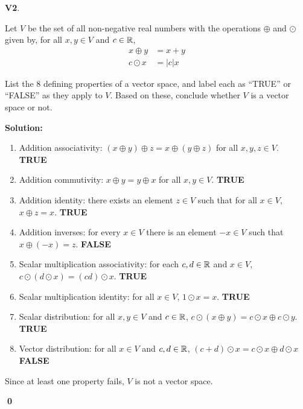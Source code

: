 \documentclass{article}
\newenvironment{problem}[1]
{
	\begin{flushleft}
	\textbf{#1}.
	\ignorespaces
}
{
	\end{flushleft}
}
\newenvironment{solution}
{
	\ignorespaces
	\textbf{Solution:}
}
{
	\ignorespacesafterend
	\begin{flushright}
	{\bfseries \qed}
	\end{flushright}
}
\begin{document}
\begin{problem}{V2}
	Let \(V\) be the set of all non-negative real numbers with the operations
	\(\oplus\) and \(\odot\) given by, for all \(x,y \in V\) and \(c \in \mathbb{R}\),
	\begin{align*}
	x \oplus y &= x+y \\
	c \odot x &= |c|x
	\end{align*}

	List the 8 defining properties of a vector space, and label each as
	``TRUE'' or ``FALSE'' as they apply to \(V\). Based on these, conclude whether
	\(V\) is a vector space or not.
	\end{problem}
\begin{solution}
	\begin{enumerate}[1)]
		\item Addition associativity:
					\((x\oplus y)\oplus z = x\oplus (y \oplus z)\)
					for all \(x,y,z \in V\).
					\textbf{TRUE}
		\item Addition commutivity:
					\(x\oplus y = y \oplus x\)
					for all \(x,y \in V\).
					\textbf{TRUE}
		\item Addition identity:
		 			there exists an element \(z \in V\) such that for all \(x \in V\),
					\(x\oplus z = x\).
					\textbf{TRUE}
		\item Addition inverses:
					for every \(x \in V\) there is an element \(-x \in V\) such that
					\(x \oplus (-x) = z \).
					\textbf{FALSE}
		\item Scalar multiplication associativity:
					for each \(c,d \in \mathbb{R}\) and \(x \in V\),
					\(c\odot (d\odot x) = (cd) \odot x\).
					\textbf{TRUE}
		\item Scalar multiplication identity:
					for all \(x \in V\), \(1 \odot x = x \).
					\textbf{TRUE}
		\item Scalar distribution:
					for all \(x,y \in V\) and \(c \in \mathbb{R}\),
					\(c\odot(x\oplus y) = c\odot x \oplus c \odot y\).
					\textbf{TRUE}
		\item Vector distribution:
					for all \(x \in V\) and \(c,d \in \mathbb{R}\),
					\( (c+d)\odot x = c\odot x \oplus d \odot x \)
					\textbf{FALSE}
	\end{enumerate}
Since at least one property fails, \(V\) is not a vector space.
\end{solution}
\end{document}
